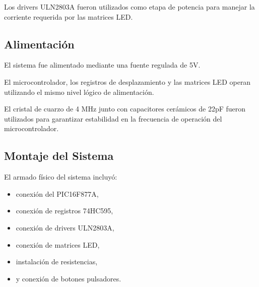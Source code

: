 Los drivers ULN2803A fueron utilizados como etapa de potencia para manejar la corriente requerida por las matrices LED.

\subsection{Alimentación}

El sistema fue alimentado mediante una fuente regulada de 5V.

El microcontrolador, los registros de desplazamiento y las matrices LED operan utilizando el mismo nivel lógico de alimentación.

El cristal de cuarzo de 4 MHz junto con capacitores cerámicos de 22pF fueron utilizados para garantizar estabilidad en la frecuencia de operación del microcontrolador.

\subsection{Montaje del Sistema}

El armado físico del sistema incluyó:

\begin{itemize}
    \item conexión del PIC16F877A,
    \item conexión de registros 74HC595,
    \item conexión de drivers ULN2803A,
    \item conexión de matrices LED,
    \item instalación de resistencias,
    \item y conexión de botones pulsadores.
\end{itemize}

